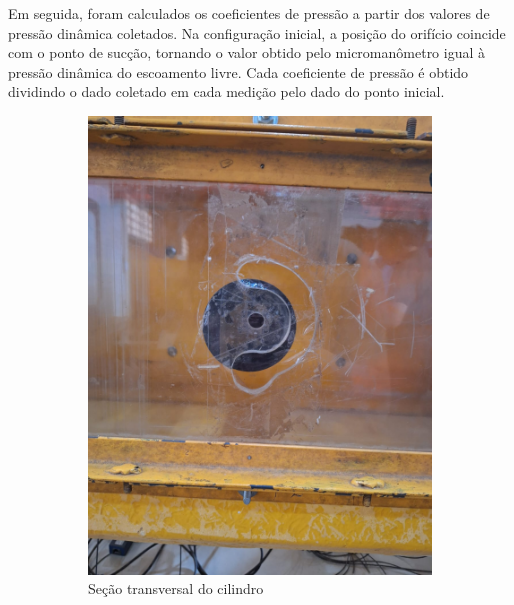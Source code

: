 Em seguida, foram calculados os coeficientes de pressão a partir dos valores de pressão dinâmica coletados. Na configuração inicial, a posição do orifício coincide com o ponto de sucção, tornando o valor obtido pelo micromanômetro igual à pressão dinâmica do escoamento livre. Cada coeficiente de pressão é obtido dividindo o dado coletado em cada medição pelo dado do ponto inicial.

\begin{figure}[htbp]
    \centering
    \begin{subfigure}{0.35\textwidth}
        \centering
        \includegraphics[width=\textwidth]{01.Parte1/Figuras/Cilindro - representação - vista da seção.jpg}
        \caption{Seção transversal do cilindro}
        \label{fig:SecTrans}
    \end{subfigure}
    \hfill
    \begin{subfigure}{0.55\textwidth}
        \centering

\end{subfigure}
\end{figure}
